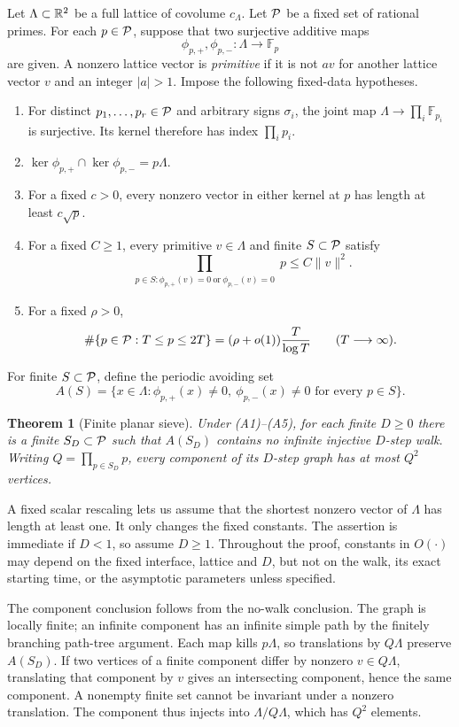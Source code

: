 \documentclass[11pt]{article}
\numberwithin{equation}{section}
\newtheorem{theorem}{Theorem}[section]
\theoremstyle{definition}\newtheorem{definition}[theorem]{Definition}
\theoremstyle{remark}\newtheorem{remark}[theorem]{Remark}
\newcommand{\F}{\mathbb F}\newcommand{\C}{\mathbb C}
\newcommand{\norm}[1]{\lVert #1\rVert}
\newcommand{\abs}[1]{\lvert #1\rvert}
\newcommand{\set}[1]{\{#1\}}
\begin{document}
Let $\Lambda\subset\mathbb R^2$ be a full lattice of covolume $c_\Lambda$. Let $\mathcal P$ be a fixed set of rational primes. For each $p\in\mathcal P$, suppose that two surjective additive maps
\[
 \phi_{p,+},\phi_{p,-}:\Lambda\longrightarrow\F_p
\]
are given. A nonzero lattice vector is \emph{primitive} if it is not $av$ for another lattice vector $v$ and an integer $\abs a>1$. Impose the following fixed-data hypotheses.
\begin{enumerate}[label=\textup{(A\arabic*)},leftmargin=3.6em]
\item\label{ax:crt} For distinct $p_1,\ldots,p_r\in\mathcal P$ and arbitrary signs $\sigma_i$, the joint map $\Lambda\to\prod_i\F_{p_i}$ is surjective. Its kernel therefore has index $\prod_i p_i$.
\item\label{ax:pair} $\ker\phi_{p,+}\cap\ker\phi_{p,-}=p\Lambda$.
\item\label{ax:collision} For a fixed $c>0$, every nonzero vector in either kernel at $p$ has length at least $c\sqrt p$.
\item\label{ax:product} For a fixed $C\ge1$, every primitive $v\in\Lambda$ and finite $S\subset\mathcal P$ satisfy
\[
 \prod_{\substack{p\in S:\phi_{p,+}(v)=0\ \text{or}\ \phi_{p,-}(v)=0}}p
 \le C\norm v^2.
\]
\item\label{ax:density} For a fixed $\rho>0$,
\[
 \#\set{p\in\PP:T\le p\le2T}=(\rho+o(1))\frac T{\log T}
 \qquad(T\longrightarrow\infty).
\]
\end{enumerate}

For finite $S\subset\mathcal P$, define the periodic avoiding set
\[
 A(S)=\set{x\in\Lambda:\phi_{p,+}(x)\ne0,\ \phi_{p,-}(x)\ne0
                 \text{ for every }p\in S}.
\]
\begin{theorem}[Finite planar sieve]\label{thm:engine}
Under \textup{(A1)--(A5)}, for each finite $D\ge0$ there is a finite $S_D\subset\mathcal P$ such that $A(S_D)$ contains no infinite injective $D$-step walk. Writing $Q=\prod_{p\in S_D}p$, every component of its $D$-step graph has at most $Q^2$ vertices.
\end{theorem}

A fixed scalar rescaling lets us assume that the shortest nonzero vector of $\Lambda$ has length at least one. It only changes the fixed constants. The assertion is immediate if $D<1$, so assume $D\ge1$. Throughout the proof, constants in $O(\cdot)$ may depend on the fixed interface, lattice and $D$, but not on the walk, its exact starting time, or the asymptotic parameters unless specified.

The component conclusion follows from the no-walk conclusion. The graph is locally finite; an infinite component has an infinite simple path by the finitely branching path-tree argument. Each map kills $p\Lambda$, so translations by $Q\Lambda$ preserve $A(S_D)$. If two vertices of a finite component differ by nonzero $v\in Q\Lambda$, translating that component by $v$ gives an intersecting component, hence the same component. A nonempty finite set cannot be invariant under a nonzero translation. The component thus injects into $\Lambda/Q\Lambda$, which has $Q^2$ elements.
\end{document}
